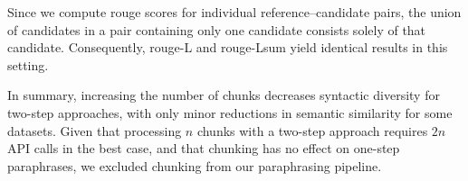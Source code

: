 Since we compute \ac{rouge} scores for individual reference–candidate pairs, the union of candidates in a pair containing only one candidate consists solely of that candidate. 
Consequently, \ac{rouge}-L and \ac{rouge}-Lsum yield identical results in this setting.

In summary, increasing the number of chunks decreases syntactic diversity for two-step approaches, with only minor reductions in semantic similarity for some datasets. 
Given that processing $n$ chunks with a two-step approach requires $2n$ API calls in the best case, and that chunking has no effect on one-step paraphrases, we excluded chunking from our paraphrasing pipeline.
